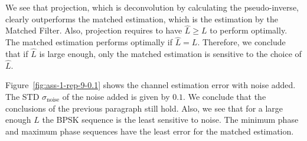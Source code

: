 \documentclass[11pt,titlepage]{report}
\begin{document}
We see that projection, which is deconvolution by calculating the pseudo-inverse, clearly outperforms the matched estimation, which is the estimation by the Matched Filter. Also, projection requires to have $\hat{L} \ge L$ to perform optimally. The matched estimation performs optimally if $\hat{L} = L$. Therefore, we conclude that if $\hat{L}$ is large enough, only the matched estimation is sensitive to the choice of $
\hat{L}$.

Figure~\ref{fig:ass-1-rep-9-0.1} shows the channel estimation error with noise added. The STD $\sigma_{\text{noise}}$ of the noise added is given by $0.1$. We conclude that the conclusions of the previous paragraph still hold. Also, we see that for a large enough $\hat{L}$ the BPSK sequence is the least sensitive to noise. The minimum phase and maximum phase sequences have the least error for the matched estimation.
\end{document}
